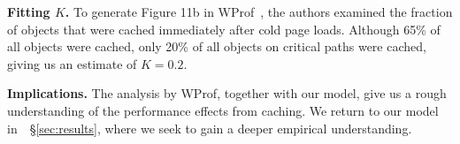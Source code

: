 %
%
%
%


%

{\bf Fitting $K$.} To generate Figure 11b in
WProf~\cite{wang2013demystifying}, the authors examined
the fraction of objects that were cached immediately after cold page loads.
Although 65\% of all objects were cached, only 20\%
of all objects on critical paths were cached, giving us an estimate of
$K=0.2$.



{\bf Implications.} The analysis by WProf, together with our model, give us a
rough understanding of the performance effects from caching. We return to
our model in~~\S\ref{sec:results}, where we seek to gain a deeper empirical understanding.
